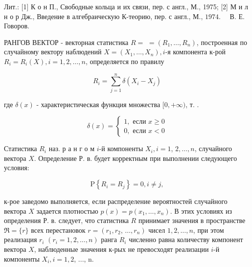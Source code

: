 \documentclass[10pt]{article}
\begin{document}
Лит.: [1] К о н П., Свободные кольца и их связи, пер. с англ., М., 1975; [2] М и л н о р Дж., Введение в алгебраическую К-теорию, пер. с англ., М., $1974 . \quad$ В. Е. Говоров.



РАНГОВ ВЕКТОР - векторная статистика $R=$ $=\left(R_{1}, \ldots, R_{n}\right)$, построенная по случайному вектору наблюдений $X=\left(X_{1}, \ldots, X_{n}\right), i$-я компонента к-рой $R_{i}=R_{i}(X), i=1,2, \ldots, n$, определяется по правилу



\[

R_{i}=\sum_{j=1}^{n} \delta\left(X_{i}-X_{j}\right)

\]



где $\delta(x)$ - характеристическая функция множества $[0,+\infty)$, т. .



\[

\delta(x)=\left\{\begin{array}{l}

1, \text { если } x \geqslant 0 \\

0, \text { если } x<0

\end{array}\right.

\]



Статистика $R_{i}$ наз. р а н г о м $i$-й компоненты $X_{i}, i=1$, $2, \ldots, n$, случайного вектора $X$. Определение Р. в. будет корректным при выполнении следующего условия:



\[

\mathrm{P}\left\{R_{i}=R_{j}\right\}=0, i \neq j,

\]



к-рое заведомо выполняется, если распределение вероятностей случайного вектора $X$ задается плотностью $p(x)=p\left(x_{1}, \ldots, x_{n}\right)$. В этих условиях из определения Р. в. следует, что статистика $R$ принимает значения в пространстве $\mathfrak{\Re}=\{r\}$ всех перестановок $r=\left(r_{1}, r_{2}\right.$, $\left.\ldots, r_{n}\right)$ чисел $1,2, \ldots, n$, при этом реализация $r_{i}$ $\left(r_{i}=1,2, \ldots, n\right)$ ранга $R_{i}$ численно равна количеству компонент вектора $X$, наблюденные значения к-рых не превосходят реализации $i$-й компоненты $X_{i}, i=1,2$, ..., n.
\end{document}

